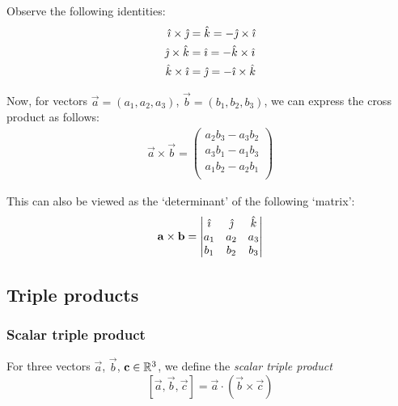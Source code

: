 \documentclass{../../template/note}
\begin{document}
    Observe the following identities:
    \begin{align*}
        \hat \imath \times \hat \jmath &= \hat k = -\hat \jmath \times \hat \imath \\
        \hat \jmath \times \hat k &= \hat \imath = -\hat k \times \hat \imath \\
        \hat k \times \hat \imath &= \hat \jmath = -\hat \imath \times \hat k
    \end{align*}
    
    Now, for vectors \(\vec a = (a_1, a_2, a_3)\), \(\vec b = (b_1, b_2, b_3)\), we can express the cross product as follows:
    \begin{align*}
        \vec a \times \vec b =
        \begin{pmatrix}
         a_2b_3-a_3b_2 \\
         a_3b_1-a_1b_3 \\
         a_1b_2-a_2b_1 \\
        \end{pmatrix}
    \end{align*}
    
    This can also be viewed as the `determinant' of the following `matrix':
    \begin{align*}
        \vec a \times \vec b = \begin{vmatrix}
         \ihat & \jhat & \khat \\
         a_1 & a_2 & a_3 \\
         b_1 & b_2 & b_3 \\
        \end{vmatrix}
    \end{align*}
    
    \subsection{Triple products}

    \subsubsection{Scalar triple product}

    \begin{definition}
        
        For three vectors \(\vec a\), \(\vec b\), \(\vec c \in \RR^3\), we define the \emph{scalar triple product}
        \[
            [\vec a, \vec b, \vec c] = \vec a \cdot (\vec b \times \vec c)
        \]

    \end{definition}
    
\end{document}
